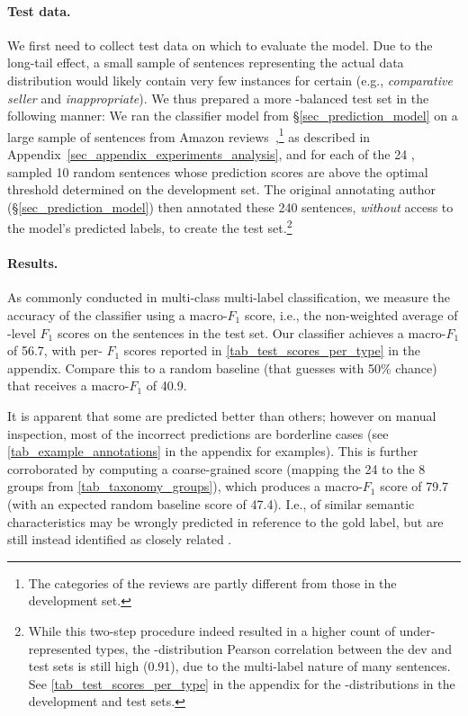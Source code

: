 \paragraph{Test data.}
We first need to collect test data on which to evaluate the model. Due to the long-tail effect, a small sample of sentences representing the actual data distribution would likely contain very few instances for certain \taxtypes{} (e.g., \textit{comparative seller} and \textit{inappropriate}).
We thus prepared a more \taxtype{}-balanced test set in the following manner: 
We ran the classifier model from \S{\ref{sec_prediction_model}} on a large sample of sentences from Amazon reviews~\citep{he2016reviewsDS},\footnote{The categories of the reviews are partly different from those in the development set.} as described in Appendix~\ref{sec_appendix_experiments_analysis}, and for each of the 24 \taxtypes{}, sampled 10 random sentences whose prediction scores are above the optimal threshold determined on the development set.
The original annotating author (\S{\ref{sec_prediction_model}}) then annotated these 240 sentences, \textit{without} access to the model's predicted labels, to create the test set.\footnote{While this two-step procedure indeed resulted in a higher count of under-represented types, the \taxtype{}-distribution Pearson correlation between the dev and test sets is still high (0.91), due to the multi-label nature of many sentences. See \autoref{tab_test_scores_per_type} in the appendix for the \taxtype{}-distributions in the development and test sets.}

\paragraph{Results.}
As commonly conducted in multi-class multi-label classification, we measure the accuracy of the classifier using a macro-$F_1$ score, i.e., the non-weighted average of \taxtype{}-level $F_1$ scores on the sentences in the test set. Our classifier achieves a macro-$F_1$ of 56.7, with per-\taxtype{} $F_1$ scores reported in \autoref{tab_test_scores_per_type} in the appendix. Compare this to a random baseline (that guesses with 50\% chance) that receives a macro-$F_1$ of 40.9.

It is apparent that some \taxtypes{} are predicted better than others; however on manual inspection, most of the incorrect predictions are borderline cases (see \autoref{tab_example_annotations} in the appendix for examples). This is further corroborated by computing a coarse-grained score (mapping the 24 \taxtypes{} to the 8 groups from \autoref{tab_taxonomy_groups}), which produces a macro-$F_1$ score of 79.7 (with an expected random baseline score of 47.4). I.e., \taxtypes{} of similar semantic characteristics may be wrongly predicted in reference to the gold label, but are still instead identified as closely related \taxtypes{}.

